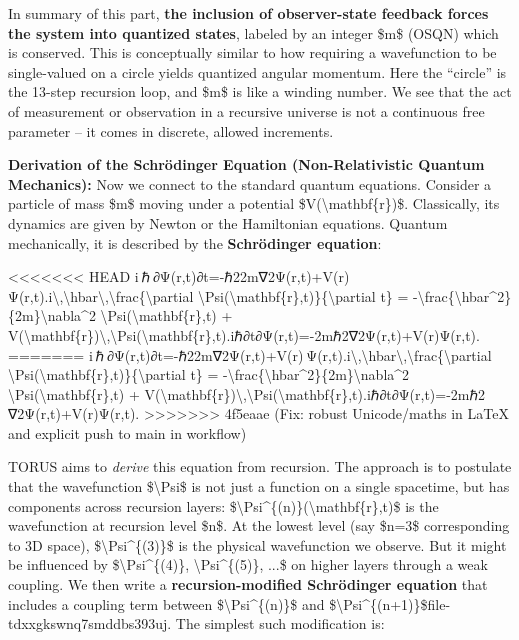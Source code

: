 \documentclass[]{article}
\begin{document}
In summary of this part, \textbf{the inclusion of observer-state
feedback forces the system into quantized states}, labeled by an integer
\$m\$ (OSQN) which is conserved. This is conceptually similar to how
requiring a wavefunction to be single-valued on a circle yields
quantized angular momentum. Here the ``circle'' is the 13-step recursion
loop, and \$m\$ is like a winding number​. We see that the act of
measurement or observation in a recursive universe is not a continuous
free parameter -- it comes in discrete, allowed increments.

\textbf{Derivation of the Schrödinger Equation (Non-Relativistic Quantum
Mechanics):} Now we connect to the standard quantum equations. Consider
a particle of mass \$m\$ moving under a potential
\$V(\textbackslash{}mathbf\{r\})\$. Classically, its dynamics are given
by Newton or the Hamiltonian equations. Quantum mechanically, it is
described by the \textbf{Schrödinger equation}:

<<<<<<< HEAD
i ℏ ∂Ψ(r,t)∂t=-ℏ22m∇2Ψ(r,t)+V(r) Ψ(r,t).i\textbackslash,\textbackslash hbar\textbackslash,\textbackslash frac\{\textbackslash partial
\textbackslash Psi(\textbackslash mathbf\{r\},t)\}\{\textbackslash partial
t\} =
-\textbackslash frac\{\textbackslash hbar\^{}2\}\{2m\}\textbackslash nabla\^{}2
\textbackslash Psi(\textbackslash mathbf\{r\},t) +
V(\textbackslash mathbf\{r\})\textbackslash,\textbackslash Psi(\textbackslash mathbf\{r\},t).iℏ∂t∂Ψ(r,t)\hspace{0pt}=-2mℏ2\hspace{0pt}∇2Ψ(r,t)+V(r)Ψ(r,t).
=======
i ℏ ∂Ψ(r,t)∂t=-ℏ22m∇2Ψ(r,t)+V(r) Ψ(r,t).i\textbackslash{},\textbackslash{}hbar\textbackslash{},\textbackslash{}frac\{\textbackslash{}partial
\textbackslash{}Psi(\textbackslash{}mathbf\{r\},t)\}\{\textbackslash{}partial
t\} =
-\textbackslash{}frac\{\textbackslash{}hbar\^{}2\}\{2m\}\textbackslash{}nabla\^{}2
\textbackslash{}Psi(\textbackslash{}mathbf\{r\},t) +
V(\textbackslash{}mathbf\{r\})\textbackslash{},\textbackslash{}Psi(\textbackslash{}mathbf\{r\},t).iℏ∂t∂Ψ(r,t)​=-2mℏ2​∇2Ψ(r,t)+V(r)Ψ(r,t).
>>>>>>> 4f5eaae (Fix: robust Unicode/maths in LaTeX and explicit push to main in workflow)

TORUS aims to \emph{derive} this equation from recursion. The approach
is to postulate that the wavefunction \$\textbackslash{}Psi\$ is not
just a function on a single spacetime, but has components across
recursion layers:
\$\textbackslash{}Psi\^{}\{(n)\}(\textbackslash{}mathbf\{r\},t)\$ is the
wavefunction at recursion level \$n\$. At the lowest level (say \$n=3\$
corresponding to 3D space), \$\textbackslash{}Psi\^{}\{(3)\}\$ is the
physical wavefunction we observe. But it might be influenced by
\$\textbackslash{}Psi\^{}\{(4)\}, \textbackslash{}Psi\^{}\{(5)\}, ...\$
on higher layers through a weak coupling. We then write a
\textbf{recursion-modified Schrödinger equation} that includes a
coupling term between \$\textbackslash{}Psi\^{}\{(n)\}\$ and
\$\textbackslash{}Psi\^{}\{(n+1)\}\$​file-tdxxgkswnq7smddbs393uj. The
simplest such modification is:
\end{document}
